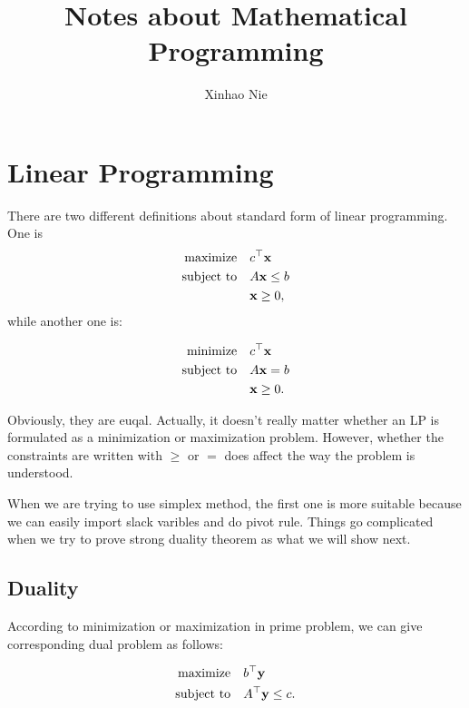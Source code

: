 \documentclass[12pt]{article}
\begin{document}
\title{Notes about Mathematical Programming}
\author{Xinhao Nie}
\maketitle

\section{Linear Programming}

There are two different definitions about
standard form of linear programming. One is
\begin{align*}
  \text{maximize} \quad & c^\top \mathbf{x} \\
  \text{subject to} \quad & A\mathbf{x} \leq b \\
                        & \mathbf{x} \geq 0,
\end{align*}
while another one is:
\begin{Define}
    \normalfont
\begin{align*}
  \text{minimize} \quad & c^\top \mathbf{x} \\
  \text{subject to} \quad & A\mathbf{x} = b \\
                        & \mathbf{x} \geq 0.
\end{align*}
\end{Define}
Obviously, they are euqal. Actually, it doesn't
really matter whether an LP is formulated as a
minimization or maximization problem. However,
whether the constraints are written with $\geq$
or $=$ does affect the way the problem is
understood.

When we are trying to use simplex method, the
first one is more suitable because we can
easily import slack varibles and do pivot
rule. Things go complicated when we try to
prove strong duality theorem as what we will
show next.

\subsection{Duality}

According to minimization or maximization
in prime problem, we can give corresponding
dual problem as follows:

\begin{Define}
    \normalfont
\begin{align*}
  \text{maximize} \quad & b^\top \mathbf{y} \\
  \text{subject to} \quad & A^\top \mathbf{y} \leq c.
\end{align*}
\end{Define}
\end{document}

